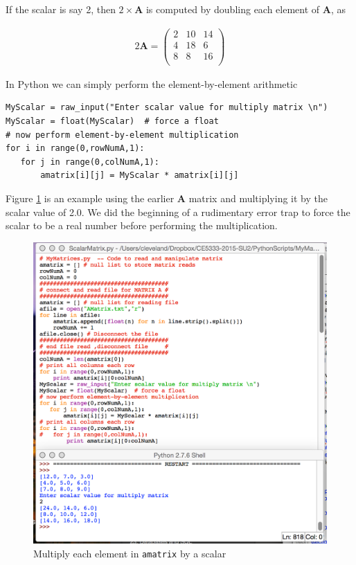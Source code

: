 If the scalar is say 2, then $2 \times \mathbf{A}$ is computed by doubling each element of $\mathbf{A}$, as

\begin{gather}
2\mathbf{A}=
\begin{pmatrix}
2 & 10 & 14\\
4 & 18 & 6 \\
8 & 8 & 16 \\
\end{pmatrix}
\end{gather}

In Python we can simply perform the element-by-element arithmetic

\begin{verbatim}
MyScalar = raw_input("Enter scalar value for multiply matrix \n")
MyScalar = float(MyScalar)  # force a float
# now perform element-by-element multiplication
for i in range(0,rowNumA,1):
   for j in range(0,colNumA,1):
       amatrix[i][j] = MyScalar * amatrix[i][j]
\end{verbatim}


Figure \ref{fig:ScalarMultiply} is an example using the earlier $\mathbf{A}$ matrix and multiplying it by the scalar value of 2.0.   
We did the beginning of a rudimentary error trap to force the scalar to be a real number before performing the multiplication.

\begin{figure}[h!] %
   \centering
   \includegraphics[width=6in]{./9-Matrix/ScalarMultiply.jpg} 
   \caption{Multiply each element in \texttt{amatrix} by a scalar }
   \label{fig:ScalarMultiply}
\end{figure}

